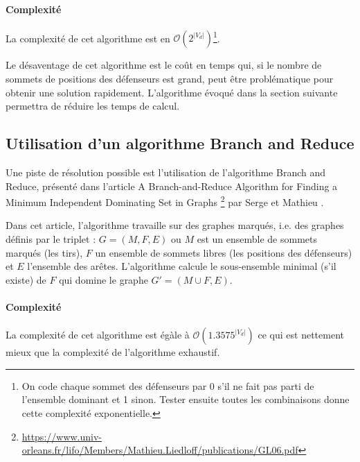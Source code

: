 \documentclass[12pt]{article}
\begin{document}
\paragraph{Complexité} La complexité de cet algorithme est en $\mathcal{O}(2^{|V_d|})$\footnote{On code chaque sommet des défenseurs par 0 s'il ne fait pas parti de l'ensemble dominant et 1 sinon. Tester ensuite toutes les combinaisons donne cette complexité exponentielle.}.

Le désaventage de cet algorithme est le coût en temps qui, si le nombre de sommets de positions des défenseurs est grand, peut être problématique pour obtenir une solution rapidement. L'algorithme évoqué dans la section suivante permettra de réduire les temps de  calcul.

\subsection{Utilisation d'un algorithme Branch and Reduce}

Une piste de résolution possible est l'utilisation de l'algorithme Branch and Reduce, présenté dans l'article \og{} A Branch-and-Reduce Algorithm for Finding a Minimum Independent Dominating Set in Graphs \fg{}\footnote{\url{https://www.univ-orleans.fr/lifo/Members/Mathieu.Liedloff/publications/GL06.pdf}} par Serge  et Mathieu .

Dans cet article, l'algorithme travaille sur des graphes marqués, i.e. des graphes définis par le triplet : $G = (M, F, E)$ ou $M$ est un ensemble de sommets marqués (les tirs), $F$ un ensemble de sommets libres (les positions des défenseurs) et $E$ l'ensemble des arêtes. L'algorithme calcule le sous-ensemble minimal (s'il existe) de $F$ qui domine le graphe $G' = (M \cup F, E)$.

\paragraph{Complexité} La complexité de cet algorithme est égàle à $\mathcal{O}(1.3575^{|V_d|})$ ce qui est nettement mieux que la complexité de l'algorithme exhaustif.


\end{document}
